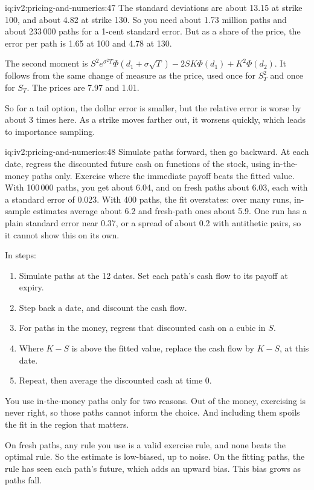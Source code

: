 \begin{solution}{iq:iv2:pricing-and-numerics:47}
The standard deviations are about 13.15 at strike 100, and about 4.82 at strike 130. So you need about 1.73 million paths and about 233\,000 paths for a 1-cent standard error. But as a share of the price, the error per path is 1.65 at 100 and 4.78 at 130.

The second moment is $S^2e^{\sigma^2T}\Phi(d_1 + \sigma\sqrt T) - 2SK\Phi(d_1) + K^2\Phi(d_2)$. It follows from the same change of measure as the price, used once for $S_T^2$ and once for $S_T$. The prices are 7.97 and 1.01.

So for a tail option, the dollar error is smaller, but the relative error is worse by about 3 times here. As a strike moves farther out, it worsens quickly, which leads to importance sampling.

\end{solution}

\begin{solution}{iq:iv2:pricing-and-numerics:48}
Simulate paths forward, then go backward. At each date, regress the discounted future cash on functions of the stock, using in-the-money paths only. Exercise where the immediate payoff beats the fitted value. With 100\,000 paths, you get about 6.04, and on fresh paths about 6.03, each with a standard error of 0.023. With 400 paths, the fit overstates: over many runs, in-sample estimates average about 6.2 and fresh-path ones about 5.9. One run has a plain standard error near 0.37, or a spread of about 0.2 with antithetic pairs, so it cannot show this on its own.

In steps:
\begin{enumerate}
\item Simulate paths at the 12 dates. Set each path's cash flow to its payoff at expiry.
\item Step back a date, and discount the cash flow.
\item For paths in the money, regress that discounted cash on a cubic in $S$.
\item Where $K - S$ is above the fitted value, replace the cash flow by $K - S$, at this date.
\item Repeat, then average the discounted cash at time 0.
\end{enumerate}

You use in-the-money paths only for two reasons. Out of the money, exercising is never right, so those paths cannot inform the choice. And including them spoils the fit in the region that matters.

On fresh paths, any rule you use is a valid exercise rule, and none beats the optimal rule. So the estimate is low-biased, up to noise. On the fitting paths, the rule has seen each path's future, which adds an upward bias. This bias grows as paths fall.

\end{solution}

